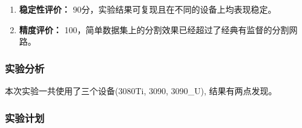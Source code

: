 \begin{enumerate}[1.]
	\item \textbf{稳定性评价：} 90分，实验结果可复现且在不同的设备上均表现稳定。
	\item \textbf{精度评价：} 100，简单数据集上的分割效果已经超过了经典有监督的分割网路。
\end{enumerate}


\subsubsection{实验分析}

本次实验一共使用了三个设备(3080Ti, 3090, 3090\_U), 结果有两点发现。

\subsubsection{实验计划}

\newpage